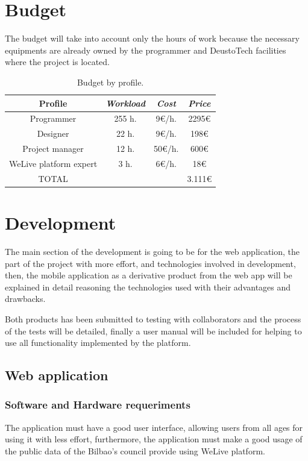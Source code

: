 \documentclass{DeustoFDP}
\begin{document}
\chapter{Budget}
The budget will take into account only the hours of work because the necessary equipments are already owned by the programmer and DeustoTech facilities where the project is located.

\begin{table}[H]
	\centering
	\caption{Budget by profile.}\label{tab:budgetprofile}
	\begin{tabular}{cccc}
		\toprule
		\textbf{Profile} & \emph{Workload} & \emph{Cost} & \emph{Price}\\
		\midrule
		Programmer  & 255 h.     & 9€/h. & 2295€ \\
		Designer   & 22 h.     & 9€/h. & 198€ \\
		Project manager & 12 h.     & 50€/h.  & 600€ \\
		WeLive platform expert & 3 h.     & 6€/h. & 18€ \\
		TOTAL & & & 3.111€\\
		\bottomrule
	\end{tabular}
\end{table}

\chapter{Development}
The main section of the development is going to be for the web application, the part of the project with more effort, and technologies involved in development, then, the mobile application as a derivative product from the web app will be explained in detail reasoning the technologies used with their advantages and drawbacks.

Both products has been submitted to testing with collaborators and the process of the tests will be detailed, finally a user manual will be included for helping to use all functionality implemented by the platform.
\section{Web application}
\subsection{Software and Hardware requeriments}
The application must have a good user interface, allowing users from all ages for using it with less effort, furthermore, the application must make a good usage of the public data of the Bilbao's council provide using WeLive platform.
\end{document}
